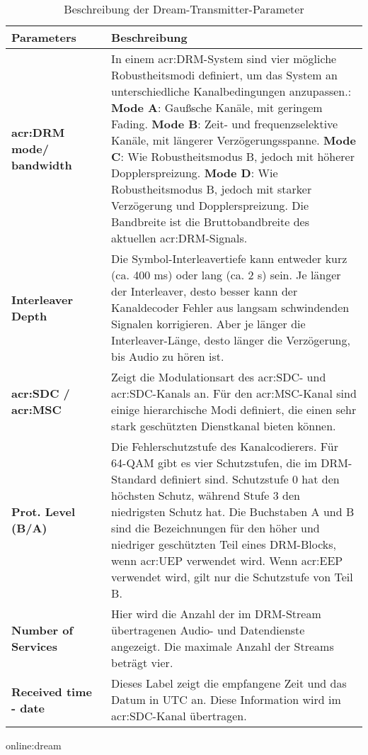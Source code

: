\begin{table}[h]
	\begin{center}
		\begin{tabular}{|p{0.28\linewidth} | p{0.72\linewidth}|}	
			\toprule
			\textbf{Parameters} &\textbf{Beschreibung}\\
			\midrule
			\textbf{\gls{acr:DRM} mode/ bandwidth} & In einem \gls{acr:DRM}-System sind vier mögliche Robustheitsmodi definiert, um das System an unterschiedliche Kanalbedingungen anzupassen.:\newline
			\textbf{Mode A}: Gaußsche Kanäle, mit geringem Fading.\newline
			\textbf{Mode B}: Zeit- und frequenzselektive Kanäle, mit längerer Verzögerungsspanne.\newline
			\textbf{Mode C}: Wie Robustheitsmodus B, jedoch mit höherer Dopplerspreizung.\newline
			\textbf{Mode D}: Wie Robustheitsmodus B, jedoch mit starker Verzögerung und Dopplerspreizung.\newline
			Die Bandbreite ist die Bruttobandbreite des aktuellen \gls{acr:DRM}-Signals. \\
			\midrule
			\textbf{Interleaver Depth} & Die Symbol-Interleavertiefe kann entweder kurz (ca. 400 ms) oder lang (ca. 2 s) sein. Je länger der Interleaver, desto besser kann der Kanaldecoder Fehler aus langsam schwindenden Signalen korrigieren. Aber je länger die Interleaver-Länge, desto länger die Verzögerung, bis Audio zu hören ist.\\
			\midrule			
			\textbf{\gls{acr:SDC} / \gls{acr:MSC}} & Zeigt die Modulationsart des \gls{acr:SDC}- und \gls{acr:SDC}-Kanals an. Für den \gls{acr:MSC}-Kanal sind einige hierarchische Modi definiert, die einen sehr stark geschützten Dienstkanal bieten können.\\
			\midrule
			\textbf{Prot. Level (B/A)} & Die Fehlerschutzstufe des Kanalcodierers. Für 64-QAM gibt es vier Schutzstufen, die im DRM-Standard definiert sind. Schutzstufe 0 hat den höchsten Schutz, während Stufe 3 den niedrigsten Schutz hat. Die Buchstaben A und B sind die Bezeichnungen für den höher und niedriger geschützten Teil eines DRM-Blocks, wenn \gls{acr:UEP} verwendet wird. Wenn \gls{acr:EEP} verwendet wird, gilt nur die Schutzstufe von Teil B.\\
			\midrule
			\textbf{Number of Services} & Hier wird die Anzahl der im DRM-Stream übertragenen Audio- und Datendienste angezeigt. Die maximale Anzahl der Streams beträgt vier.\\
			\midrule
			\textbf{Received time - date} & Dieses Label zeigt die empfangene Zeit und das Datum in UTC an. Diese Information wird im \gls{acr:SDC}-Kanal übertragen.\\
			\bottomrule
		\end{tabular}
		\caption{Beschreibung der Dream-Transmitter-Parameter}\gls{online:dream}
		\label{tab:dreamparam}
	\end{center}
\end{table}

